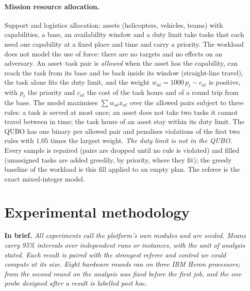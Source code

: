 \documentclass[11pt,a4paper]{article}
\newcommand{\inbrief}[1]{\par\smallskip\noindent\textbf{In brief.} \emph{#1}\par\medskip}
\begin{document}
\paragraph{Mission resource allocation.} Support and logistics allocation:
assets (helicopters, vehicles, teams) with capabilities, a base, an
availability window and a duty limit take tasks that each need one
capability at a fixed place and time and carry a priority. The workload does
not model the use of force: there are no targets and no effects on an
adversary. An asset--task pair is \emph{allowed} when the asset has the
capability, can reach the task from its base and be back inside its window
(straight-line travel), the task alone fits the duty limit, and the weight
$w_{at} = 1000\,p_t - c_{at}$ is positive, with $p_t$ the priority and
$c_{at}$ the cost of the task hours and of a round trip from the base. The
model maximises $\sum w_{at} x_{at}$ over the allowed pairs subject to three
rules: a task is served at most once; an asset does not take two tasks it
cannot travel between in time; the task hours of an asset stay within its
duty limit. The QUBO has one binary per allowed pair and penalises
violations of the first two rules with $1.05$ times the largest weight.
\emph{The duty limit is not in the QUBO.} Every sample is repaired (pairs
are dropped until no rule is violated) and filled (unassigned tasks are
added greedily, by priority, where they fit); the greedy baseline of the
workload is this fill applied to an empty plan. The referee is the exact
mixed-integer model.

\section{Experimental methodology}
\label{sec:method}

\inbrief{All experiments call the platform's own modules and are seeded.
Means carry 95\% intervals over independent runs or instances, with the unit
of analysis stated. Each result is paired with the strongest referee and
control we could compute at its size. Eight hardware rounds ran on three IBM
Heron processors; from the second round on the analysis was fixed before the
first job, and the one probe designed after a result is labelled post hoc.}
\end{document}

